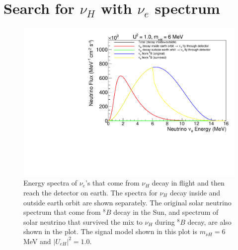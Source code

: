 \documentclass[%
 reprint,
 amsmath,amssymb,
 aps,
 prd,
floatfix,
twocolumn,
]{revtex4-1}
\begin{document}
\clearpage

\section{\label{sec:NueSpectrum} Search for $\nu_H$ with $\nu_e$ spectrum}

\begin{figure}[!htbp]
\includegraphics[width=0.99\columnwidth]{../plots/DecayInFlightNuLEnergy_U1.0_M6.0_InsideOutside_linXlinY.pdf}
\caption{Energy spectra of $\nu_e$'s that come from $\nu_H$ decay in flight and then reach the detector on earth. The spectra for $\nu_H$ decay inside and outside earth orbit are shown separately. 
The original solar neutrino spectrum that come from $^8 B$ decay in the Sun, and spectrum of solar neutrino that survived the mix to $\nu_H$ during $^{8}B$ decay, are also shown in the plot. The signal model shown in this plot is $m_{\nu H} = 6$ MeV and $|U_{eH}|^2 = 1.0$.}
\label{fig:DecayInFlightSpectrum_U_M6} 
\end{figure}
\end{document}
